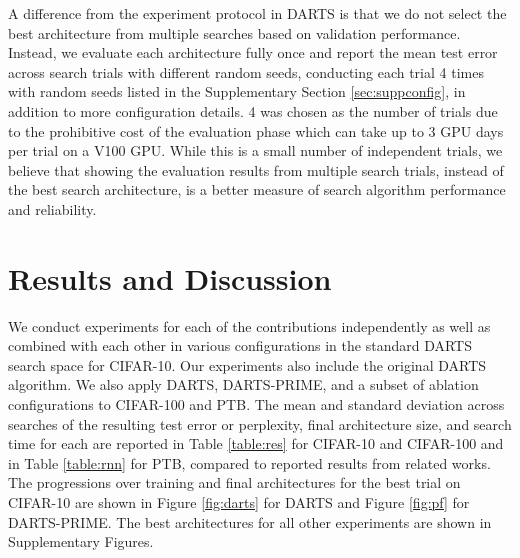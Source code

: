 \documentclass[letterpaper]{article} \usepackage{aaai22}  \usepackage{times}  \usepackage{helvet}  \usepackage{courier}  \usepackage[hyphens]{url}  \usepackage{graphicx} \urlstyle{rm} \def\UrlFont{\rm}  \usepackage{natbib}  \usepackage{caption} \DeclareCaptionStyle{ruled}{labelfont=normalfont,labelsep=colon,strut=off} \frenchspacing  \setlength{\pdfpagewidth}{8.5in}  \setlength{\pdfpageheight}{11in}  \usepackage{algorithm}
\begin{document}
A difference from the experiment protocol in DARTS is that we do not select the best architecture from multiple searches based on validation performance. Instead, we evaluate each architecture fully once and report the mean test error across search trials with different random seeds, conducting each trial 4 times with random seeds listed in the Supplementary Section \ref{sec:suppconfig}, in addition to more configuration details. 4 was chosen as the number of trials due to the prohibitive cost of the evaluation phase which can take up to 3 GPU days per trial on a V100 GPU. While this is a small number of independent trials, we believe that showing the evaluation results from multiple search trials, instead of the best search architecture, is a better measure of search algorithm performance and reliability. 

\section{Results and Discussion}

We conduct experiments for each of the contributions independently as well as combined with each other in various configurations in the standard DARTS search space for CIFAR-10. Our experiments also include the original DARTS algorithm. We also apply DARTS, DARTS-PRIME, and a subset of ablation configurations to CIFAR-100 and PTB. The mean and standard deviation across searches of the resulting test error or perplexity, final architecture size, and search time for each are reported in Table \ref{table:res} for CIFAR-10 and CIFAR-100 and in Table \ref{table:rnn} for PTB, compared to reported results from related works. The  progressions over training and final architectures for the best trial on CIFAR-10 are shown in Figure \ref{fig:darts} for DARTS and Figure \ref{fig:pf} for DARTS-PRIME. The best architectures for all other experiments are shown in Supplementary Figures.
\end{document}
